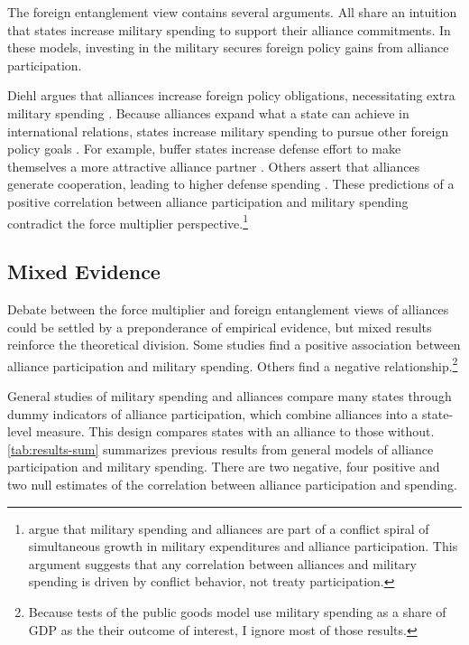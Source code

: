 \documentclass[12pt]{article}
\begin{document}
The foreign entanglement view contains several arguments.
All share an intuition that states increase military spending to support their alliance commitments. 
In these models, investing in the military secures foreign policy gains from alliance participation. 


Diehl argues that alliances increase foreign policy obligations, necessitating extra military spending \citep{Diehl1994}.
Because alliances expand what a state can achieve in international relations, states increase military spending to pursue other foreign policy goals \cite{MorganPalmer2006}.
For example, buffer states increase defense effort to make themselves a more attractive alliance partner \citep{Horowitzetal2017}.
Others assert that alliances generate cooperation, leading to higher defense spending \citep{Palmer1990, QuirozFlores2011}. 
These predictions of a positive correlation between alliance participation and military spending contradict the force multiplier perspective.\footnote{
\citet{SeneseVasquez2008} argue that military spending and alliances are part of a conflict spiral of simultaneous growth in military expenditures and alliance participation. 
This argument suggests that any correlation between alliances and military spending is driven by conflict behavior, not treaty participation.
}


\subsection{Mixed Evidence} 


Debate between the force multiplier and foreign entanglement views of alliances could be settled by a preponderance of empirical evidence, but mixed results reinforce the theoretical division.
Some studies find a positive association between alliance participation and military spending. 
Others find a negative relationship.\footnote{
Because tests of the public goods model use military spending as a share of GDP as the their outcome of interest, I ignore most of those results.} 


General studies of military spending and alliances compare many states through dummy indicators of alliance participation, which combine alliances into a state-level measure. 
This design compares states with an alliance to those without.
\autoref{tab:results-sum} summarizes previous results from general models of alliance participation and military spending. 
There are two negative, four positive and two null estimates of the correlation between alliance participation and spending. 
\end{document}
